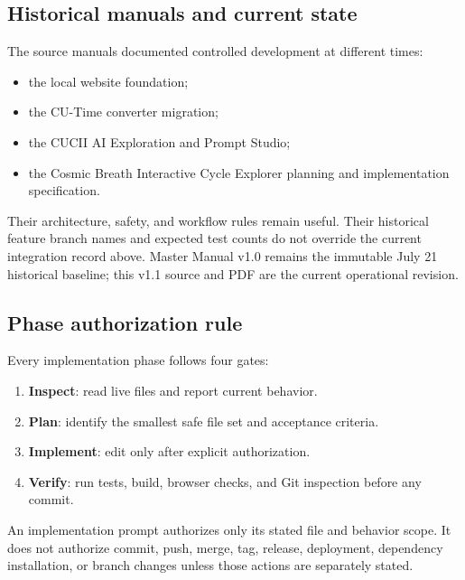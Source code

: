 \documentclass[11pt,letterpaper]{article}
\begin{document}
\subsection{Historical manuals and current state}

The source manuals documented controlled development at different times:

\begin{itemize}
    \item the local website foundation;
    \item the CU-Time converter migration;
    \item the CUCII AI Exploration and Prompt Studio;
    \item the Cosmic Breath Interactive Cycle Explorer planning and implementation specification.
\end{itemize}

Their architecture, safety, and workflow rules remain useful. Their historical
feature branch names and expected test counts do not override the current
integration record above. Master Manual v1.0 remains the immutable July 21
historical baseline; this v1.1 source and PDF are the current operational
revision.

\subsection{Phase authorization rule}

Every implementation phase follows four gates:

\begin{enumerate}
    \item \textbf{Inspect}: read live files and report current behavior.
    \item \textbf{Plan}: identify the smallest safe file set and acceptance
          criteria.
    \item \textbf{Implement}: edit only after explicit authorization.
    \item \textbf{Verify}: run tests, build, browser checks, and Git inspection
          before any commit.
\end{enumerate}

\begin{safetybox}
An implementation prompt authorizes only its stated file and behavior scope. It
does not authorize commit, push, merge, tag, release, deployment, dependency
installation, or branch changes unless those actions are separately stated.
\end{safetybox}
\end{document}
